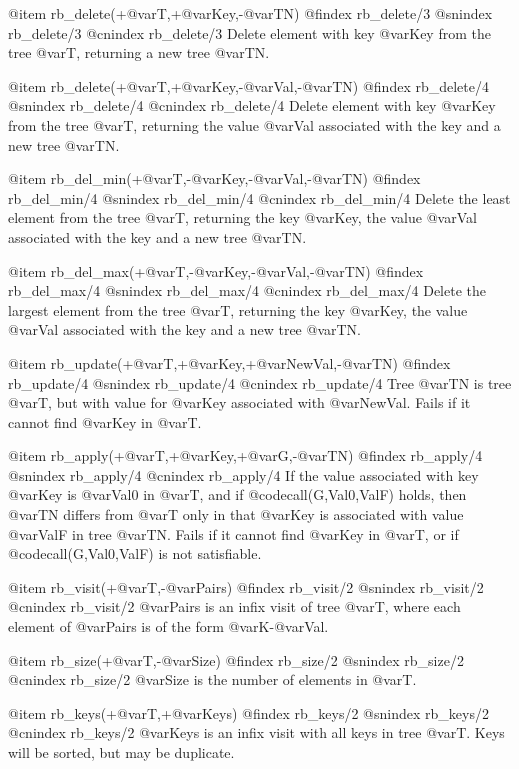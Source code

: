 {{{{{{{{@item rb_delete(+@var{T},+@var{Key},-@var{TN})
@findex rb_delete/3
@snindex rb_delete/3
@cnindex rb_delete/3
Delete element with key @var{Key} from the tree @var{T}, returning a new
tree @var{TN}.

@item rb_delete(+@var{T},+@var{Key},-@var{Val},-@var{TN})
@findex rb_delete/4
@snindex rb_delete/4
@cnindex rb_delete/4
Delete element with key @var{Key} from the tree @var{T}, returning the
value @var{Val} associated with the key and a new tree @var{TN}.

@item rb_del_min(+@var{T},-@var{Key},-@var{Val},-@var{TN})
@findex rb_del_min/4
@snindex rb_del_min/4
@cnindex rb_del_min/4
Delete the least element from the tree @var{T}, returning the key
@var{Key}, the value @var{Val} associated with the key and a new tree
@var{TN}.

@item rb_del_max(+@var{T},-@var{Key},-@var{Val},-@var{TN})
@findex rb_del_max/4
@snindex rb_del_max/4
@cnindex rb_del_max/4
Delete the largest element from the tree @var{T}, returning the key
@var{Key}, the value @var{Val} associated with the key and a new tree
@var{TN}.

@item rb_update(+@var{T},+@var{Key},+@var{NewVal},-@var{TN})
@findex rb_update/4
@snindex rb_update/4
@cnindex rb_update/4
Tree @var{TN} is tree @var{T}, but with value for @var{Key} associated
with @var{NewVal}. Fails if it cannot find @var{Key} in @var{T}.

@item rb_apply(+@var{T},+@var{Key},+@var{G},-@var{TN})
@findex rb_apply/4
@snindex rb_apply/4
@cnindex rb_apply/4
If the value associated with key @var{Key} is @var{Val0} in @var{T}, and
if @code{call(G,Val0,ValF)} holds, then @var{TN} differs from
@var{T} only in that @var{Key} is associated with value @var{ValF} in
tree @var{TN}. Fails if it cannot find @var{Key} in @var{T}, or if
@code{call(G,Val0,ValF)} is not satisfiable.

@item rb_visit(+@var{T},-@var{Pairs})
@findex rb_visit/2
@snindex rb_visit/2
@cnindex rb_visit/2
@var{Pairs} is an infix visit of tree @var{T}, where each element of
@var{Pairs} is of the form  @var{K}-@var{Val}.

@item rb_size(+@var{T},-@var{Size})
@findex rb_size/2
@snindex rb_size/2
@cnindex rb_size/2
@var{Size} is the number of elements in @var{T}.

@item rb_keys(+@var{T},+@var{Keys})
@findex rb_keys/2
@snindex rb_keys/2
@cnindex rb_keys/2
@var{Keys} is an infix visit with all keys in tree @var{T}. Keys will be
sorted, but may be duplicate.

}}}}}}}}
